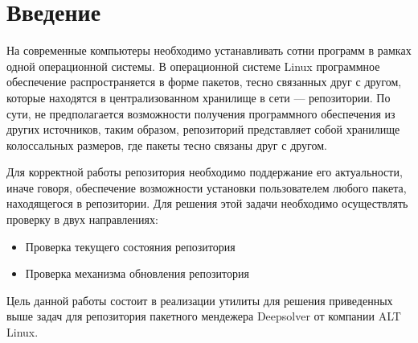 \section*{Введение}
На современные компьютеры необходимо устанавливать сотни программ в рамках
одной операционной системы. В операционной системе Linux программное 
обеспечение распространяется в форме пакетов, тесно связанных друг с другом,
которые находятся в централизованном хранилище в сети --- репозитории. По
сути, не предполагается возможности получения программного обеспечения из 
других источников, таким образом, репозиторий представляет собой хранилище 
колоссальных размеров, где пакеты тесно связаны друг с другом.

Для корректной работы репозитория необходимо поддержание его актуальности, 
иначе говоря, обеспечение возможности установки пользователем любого пакета,
находящегося в репозитории. Для решения этой задачи необходимо осуществлять
проверку в двух направлениях: 
\begin{itemize}
\item{Проверка текущего состояния репозитория}
\item{Проверка механизма обновления репозитория}
\end{itemize}

Цель данной работы состоит в реализации утилиты для решения приведенных
выше задач для репозитория пакетного мендежера Deepsolver от компании
ALT Linux.









